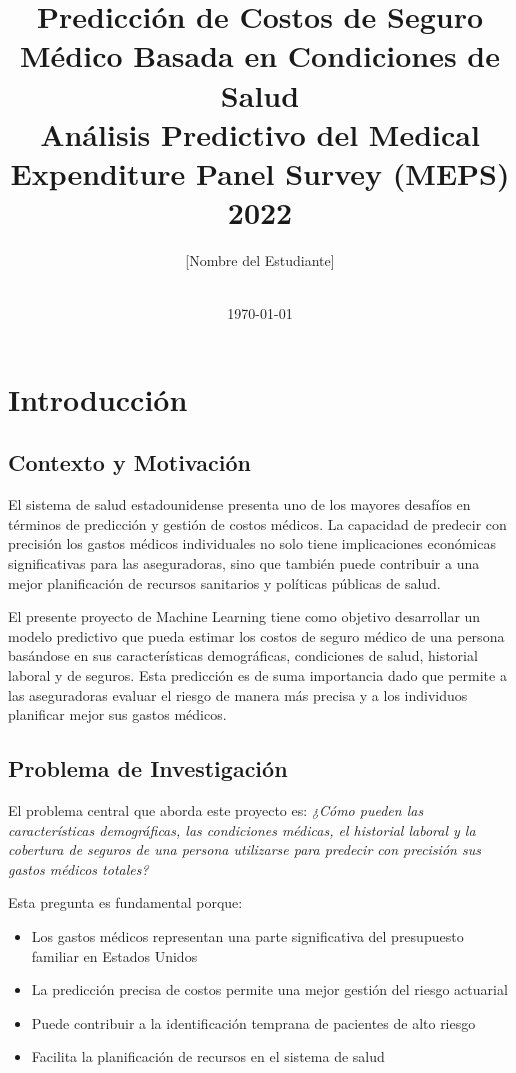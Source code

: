 \documentclass[12pt,a4paper]{article}
\title{
\textbf{Predicción de Costos de Seguro Médico Basada en Condiciones de Salud}\\
\Large{Análisis Predictivo del Medical Expenditure Panel Survey (MEPS) 2022}
}
\author{
[Nombre del Estudiante]\\
[Institución Educativa]\\
[Programa Académico]
}
\date{\today}
\begin{document}
\maketitle

\newpage

\tableofcontents

\newpage

\section{Introducción}

\subsection{Contexto y Motivación}

El sistema de salud estadounidense presenta uno de los mayores desafíos en términos de predicción y gestión de costos médicos. La capacidad de predecir con precisión los gastos médicos individuales no solo tiene implicaciones económicas significativas para las aseguradoras, sino que también puede contribuir a una mejor planificación de recursos sanitarios y políticas públicas de salud.

El presente proyecto de Machine Learning tiene como objetivo desarrollar un modelo predictivo que pueda estimar los costos de seguro médico de una persona basándose en sus características demográficas, condiciones de salud, historial laboral y de seguros. Esta predicción es de suma importancia dado que permite a las aseguradoras evaluar el riesgo de manera más precisa y a los individuos planificar mejor sus gastos médicos.

\subsection{Problema de Investigación}

El problema central que aborda este proyecto es: \textit{¿Cómo pueden las características demográficas, las condiciones médicas, el historial laboral y la cobertura de seguros de una persona utilizarse para predecir con precisión sus gastos médicos totales?}

Esta pregunta es fundamental porque:
\begin{itemize}
    \item Los gastos médicos representan una parte significativa del presupuesto familiar en Estados Unidos
    \item La predicción precisa de costos permite una mejor gestión del riesgo actuarial
    \item Puede contribuir a la identificación temprana de pacientes de alto riesgo
    \item Facilita la planificación de recursos en el sistema de salud
\end{itemize}
\end{document}
